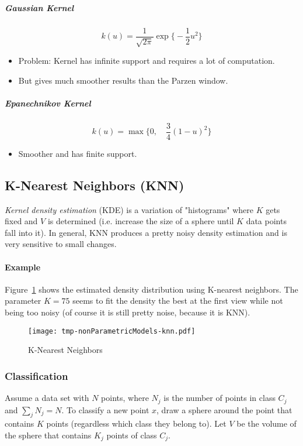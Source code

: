 \documentclass[a4paper, 11pt, accentcolor = tud3b]{tudreport}
\begin{document}
					\subparagraph{Gaussian Kernel}
					\begin{equation}
						k(u) = \frac{1}{\sqrt{2\pi}} \exp\Bigg\{ -\frac{1}{2} u^2 \Bigg\}
					\end{equation}
					\begin{itemize}
						\item Problem: Kernel has infinite support and requires a lot of computation.
						\item But gives much smoother results than the Parzen window.
					\end{itemize}

					\subparagraph{Epanechnikov Kernel}
					\begin{equation}
						k(u) = \max\Bigg\{ 0,\quad \frac{3}{4} (1 - u)^2 \Bigg\}
					\end{equation}
					\begin{itemize}
						\item Smoother and has finite support.
					\end{itemize}

			\subsection{K-Nearest Neighbors (KNN)}
				\emph{Kernel density estimation} (KDE) is a variation of "histograms" where \(K\) gets fixed and \(V\) is determined (i.e. increase the size of a sphere until \(K\) data points fall into it). In general, KNN produces a pretty noisy density estimation and is very sensitive to small changes.

				\paragraph{Example}
					Figure~\ref{fig:knn} shows the estimated density distribution using K-nearest neighbors. The parameter \( K = 75 \) seems to fit the density the best at the first view while not being too noisy (of course it is still pretty noise, because it is KNN).

					\begin{figure}
						\centering
						\texttt{[image: tmp-nonParametricModels-knn.pdf]}
						\caption{K-Nearest Neighbors}
						\label{fig:knn}
					\end{figure}

				\subsubsection{Classification}
					Assume a data set with \(N\) points, where \(N_j\) is the number of points in class \(C_j\) and \( \sum_j N_j = N \). To classify a new point \(x\), draw a sphere around the point that contains \(K\) points (regardless which class they belong to). Let \(V\) be the volume of the sphere that contains \(K_j\) points of class \(C_j\).
\end{document}
